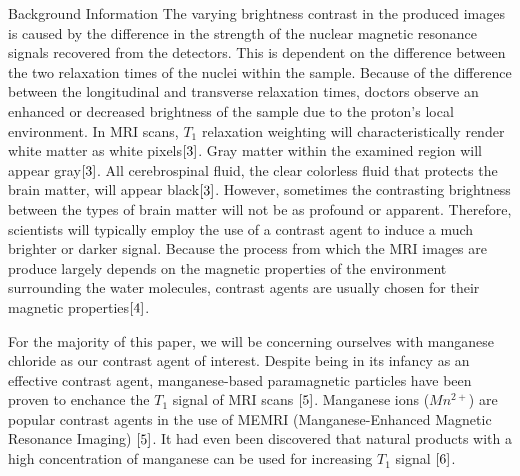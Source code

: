 \documentclass[a4paper,12pt]{article}
\begin{document}
\begin{section}{Background Information}
The varying brightness contrast in the produced images is caused by the difference in the strength of the nuclear magnetic resonance signals recovered from the detectors. 
This is dependent on the difference between the two relaxation times of the nuclei within the sample. Because of the difference between the longitudinal and transverse relaxation times, doctors observe an enhanced or decreased brightness of the sample due to the proton's local environment. In MRI scans, $T_1$ relaxation weighting will characteristically render white matter as white pixels$\cite{3}$. Gray matter within the examined region will appear gray$\cite{3}$. All cerebrospinal fluid, the clear colorless fluid that protects the brain matter, will appear black$\cite{3}$. However, sometimes the contrasting brightness between the types of brain matter will not be as profound or apparent. Therefore, scientists will typically employ the use of a contrast agent to induce a much brighter or darker signal. Because the process from which the MRI images are produce largely depends on the magnetic properties of the environment surrounding the water molecules, contrast agents are usually chosen for their magnetic properties$\cite{4}$. 

For the majority of this paper, we will be concerning ourselves with manganese chloride as our contrast agent of interest. Despite being in its infancy as an effective contrast agent, manganese-based paramagnetic particles have been proven to enchance the $T_1$ signal of MRI scans $\cite{5}$. Manganese ions ($Mn^{2+}$) are popular contrast agents in the use of MEMRI (Manganese-Enhanced Magnetic Resonance Imaging) $\cite{5}$. It had even been discovered that natural products with a high concentration of manganese can be used for increasing $T_1$ signal $\cite{6}$.


\end{section}
\end{document}
